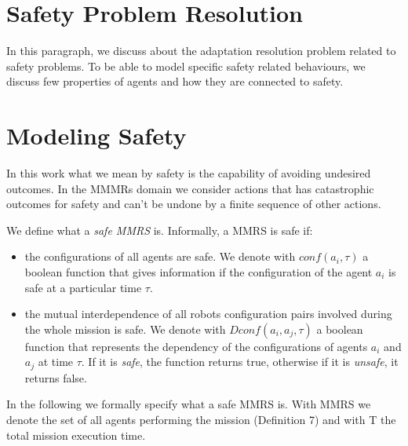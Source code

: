 \documentclass[journal]{IEEEtran}
\theoremstyle{definition}
\begin{document}
\section{Safety Problem Resolution} 

In this paragraph, we discuss about the adaptation resolution problem related to safety problems. To be able to model specific safety related behaviours, we discuss few properties of agents and how they are connected to safety.

\section{Modeling Safety}






In this work what we mean by safety is the capability of avoiding undesired outcomes. In the MMMRs domain we consider actions that has catastrophic outcomes for safety and can't be undone by a finite sequence of other actions. 

We define what a \textit{safe MMRS} is. Informally, a MMRS is safe if:
\begin{itemize}
\item the configurations of all agents are safe. We denote with $conf(a_i, \tau)$ a boolean function that gives information if the configuration of the agent $a_i$ is safe at a particular time $\tau$.
\item the mutual interdependence of all robots configuration pairs involved during the whole mission is safe. We denote with $Dconf(a_i, a_j,\tau)$ a boolean function that represents the dependency of the configurations of agents $a_i$ and $a_j$ at time $\tau$. If it is \textit{safe}, the function returns true, otherwise if it is \textit{unsafe}, it returns false.
\end{itemize}

In the following we formally specify what a safe MMRS is. With MMRS we denote the set of all agents performing the mission (Definition 7) and with T the total mission execution time. 
\end{document}
